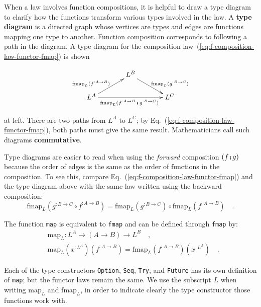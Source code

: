 When a law involves function compositions, it is helpful to draw a
type diagram to clarify how the functions transform
various types involved in the law. A \textbf{type diagram}
is a directed graph whose vertices are types and edges are functions
mapping one type to another. Function composition corresponds to following
a path in the diagram. A type diagram for the composition law~(\ref{eq:f-composition-law-functor-fmap})
is shown\begin{wrapfigure}{l}{0.4\columnwidth}%
\vspace{-1.9\baselineskip}
\[
\xymatrix{\xyScaleY{1.5pc}\xyScaleX{3pc} & L^{B}\ar[rd]\sp(0.6){~~\text{fmap}_{L}(g^{:B\rightarrow C})}\\
L^{A}\ar[ru]\sp(0.4){\text{fmap}_{L}(f^{:A\rightarrow B})\ ~}\ar[rr]\sb(0.5){\text{fmap}_{L}(f^{:A\rightarrow B}\bef g^{:B\rightarrow C})\ } &  & L^{C}
}
\]

\vspace{-2\baselineskip}
\end{wrapfigure}%
at left. There are two paths from $L^{A}$ to $L^{C}$; by Eq.~(\ref{eq:f-composition-law-functor-fmap}),
both paths must give the same result. Mathematicians call such diagrams
\textbf{commutative}.

Type diagrams are easier to read when using the \emph{forward} composition
$\left(f\bef g\right)$ because the order of edges is the same as
the order of functions in the composition. To see this, compare Eq.~(\ref{eq:f-composition-law-functor-fmap})
and the type diagram above with the same law written using the backward
composition:
\[
\text{fmap}_{L}(g^{:B\rightarrow C}\circ f^{:A\rightarrow B})=\text{fmap}_{L}(g^{:B\rightarrow C})\circ\text{fmap}_{L}(f^{:A\rightarrow B})\quad.
\]

The function \lstinline!map! is equivalent to \lstinline!fmap! and
can be defined through \lstinline!fmap! by:
\begin{align*}
 & \text{map}_{L}:L^{A}\rightarrow\left(A\rightarrow B\right)\rightarrow L^{B}\quad,\\
 & \text{map}_{L}(x^{:L^{A}})(f^{:A\rightarrow B})=\text{fmap}_{L}(f^{:A\rightarrow B})(x^{:L^{A}})\quad.
\end{align*}

Each of the type constructors \lstinline!Option!, \lstinline!Seq!,
\lstinline!Try!, and \lstinline!Future! has its own definition of
\lstinline!map!; but the functor laws remain the same. We use the
subscript $L$ when writing $\text{map}_{L}$ and $\text{fmap}_{L}$,
in order to indicate clearly the type constructor those functions
work with.

